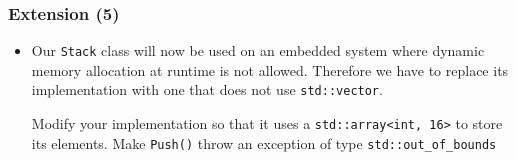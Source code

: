 \documentclass[10pt,aspectratio=169]{beamer}
\begin{document}
\begin{frame}[fragile]
  \frametitle{Extension (5)}
  \begin{itemize}
  \item Our \texttt{Stack} class will now be used on an embedded
    system where dynamic memory allocation at runtime is not allowed.
    Therefore we have to replace its implementation with one that does
    not use \verb!std::vector!.

    Modify your implementation so that it uses a
    \verb|std::array<int, 16>| to store its elements. Make
    \texttt{Push()} throw an exception of type
    \verb!std::out_of_bounds!
  \end{itemize}
\end{frame}

\end{document}
